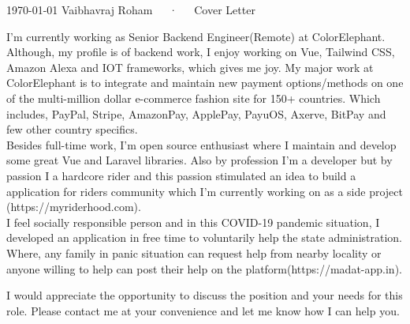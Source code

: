 \documentclass[11pt, a4paper]{awesome-cv}
\begin{document}
\makecvheader[R]

\makecvfooter
  {\today}
  {Vaibhavraj Roham~~~·~~~Cover Letter}
  {}

\makelettertitle

\begin{cvletter}

I'm currently working as Senior Backend Engineer(Remote) at ColorElephant. Although, my profile is of backend work, I enjoy working on Vue, Tailwind CSS, Amazon Alexa and IOT frameworks, which gives me joy. My major work at ColorElephant is to integrate and maintain new payment options/methods on one of the multi-million dollar e-commerce fashion site for 150+ countries. Which includes, PayPal, Stripe, AmazonPay, ApplePay, PayuOS, Axerve, BitPay and few other country specifics.\\

Besides full-time work, I'm open source enthusiast where I maintain and develop some great Vue and Laravel libraries. Also by profession I'm a developer but by passion I a hardcore rider and this passion stimulated an idea to build a application for riders community which I'm currently working on as a side project (https://myriderhood.com). \\

I feel socially responsible person and in this COVID-19 pandemic situation, I developed an application in free time to voluntarily help the state administration. Where, any family in panic situation can request help from nearby locality or anyone willing to help can post their help on the platform(https://madat-app.in). 


I would appreciate the opportunity to discuss the position and your needs for this role. Please contact me at your convenience and let me know how I can help you.

\end{cvletter}


\makeletterclosing
\end{document}
